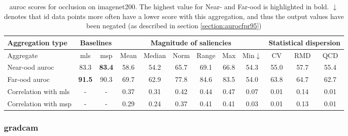 \documentclass[UKenglish]{uiomasterthesis} %
\theoremstyle{definition}
\begin{document}
\begin{table}[H]
\setlength\tabcolsep{3pt}
\begin{center}
\begin{tabular}{ |p{5em}|c c|c c c c c c|c c c| }
    \hline
     \centering Aggregation type & \multicolumn{2}{c|}{Baselines} & \multicolumn{6}{c|}{Magnitude of saliencies} & \multicolumn{3}{p{8em}|}{\centering Statistical dispersion} \\
    \hline
    Aggregate & \ac{mls} & \ac{msp} & Mean & Median & Norm & Range & Max & Min$\downarrow$ & CV & RMD & QCD  \\
    \hline
    \rowcolor{near!50}
    Near-\ac{ood} \ac{auroc} & 83.3 &\textbf{ 83.4 }& 58.6 & 54.2 & 65.7 & 69.1 & 66.8 & 54.3 & 55.0 & 57.7 & 55.4  \\
    \hline
    \rowcolor{far!50}
    Far-\ac{ood} \ac{auroc} &\textbf{ 91.5 }& 90.3 & 69.7 & 62.9 & 77.8 & 84.6 & 83.5 & 54.0 & 63.8 & 64.7 & 62.7  \\
    \hline
    Correlation with \ac{mls}& - & - & 0.37 & 0.31 & 0.42 & 0.44 & 0.47 & 0.07 & 0.01 & 0.14 & 0.01  \\
    \hline
    Correlation with \ac{msp}& - & - & 0.29 & 0.24 & 0.37 & 0.41 & 0.41 & 0.03 & 0.01 & 0.13 & 0.01  \\
    \hline
    \end{tabular}
    \caption{\ac{auroc} scores for occlusion on imagenet200. The highest value for Near- and Far-\ac{ood} is highlighted in bold. $\downarrow$ denotes that \ac{id} data points more often have a lower score with this aggregation, and thus the output values have been negated (as described in section \ref{section:aurocfpr95})}
    \label{table:imagenet200_occlusion_metrics}
\end{center}
\setlength\tabcolsep{6pt}
\end{table}

\subsubsection{\ac{gradcam}}
\end{document}
